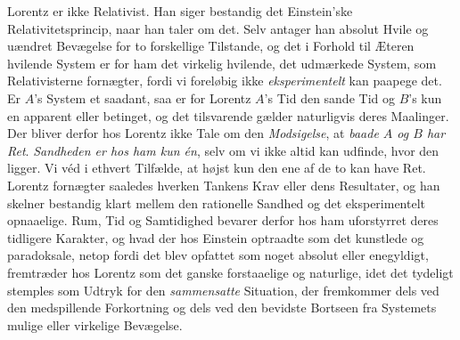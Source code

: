 \documentclass[12pt,a4paper]{article}
\begin{document}
Lorentz er ikke Relativist. Han siger bestandig \guillemotleft det
Einstein'ske Relativitetsprincip\guillemotright, naar han taler om det. Selv
antager han absolut Hvile og uændret Bevægelse for to forskellige Tilstande, og
det i Forhold til Æteren hvilende System er for ham det virkelig hvilende, det
\guillemotleft udmærkede\guillemotright{} System, som Relativisterne fornægter,
fordi vi foreløbig ikke \emph{eksperimentelt} kan paapege det. Er $A$'s System
et saadant, saa er for Lorentz $A$'s Tid den sande Tid og $B$'s kun en
apparent eller betinget, og det tilsvarende gælder naturligvis deres
Maalinger. Der bliver derfor hos Lorentz ikke Tale om den \emph{Modsigelse},
at \emph{baade $A$ og $B$ har Ret}. \emph{Sandheden er hos ham kun én}, selv om
vi ikke altid kan udfinde, hvor den ligger. Vi véd i ethvert Tilfælde, at højst
kun den ene af de to kan have Ret. Lorentz fornægter saaledes hverken Tankens
Krav eller dens Resultater, og han skelner bestandig klart mellem den rationelle
Sandhed og det eksperimentelt opnaaelige. Rum, Tid og Samtidighed bevarer
derfor hos ham uforstyrret deres tidligere Karakter, og hvad der hos Einstein
optraadte som det kunstlede og paradoksale, netop fordi det blev opfattet som
noget absolut eller enegyldigt, fremtræder hos Lorentz som det ganske
forstaaelige og naturlige, idet det tydeligt stemples som Udtryk for den
\emph{sammensatte} Situation, der fremkommer dels ved den medspillende
Forkortning og dels ved den bevidste Bortseen fra Systemets mulige eller
virkelige Bevægelse.
\end{document}
